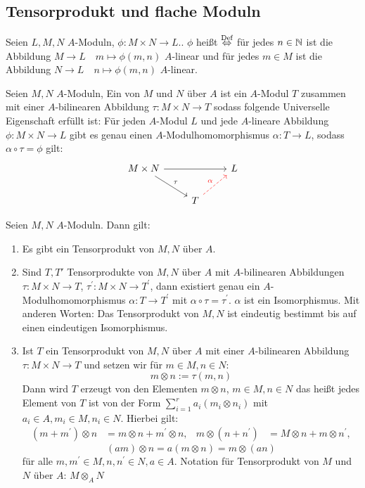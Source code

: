 \subsection{ Tensorprodukt und flache Moduln}
\begin{df}\label{13.1}
	Seien $L,M,N$ $A$-Moduln, $\phi: M \times N \to L. $. $ \phi$  heißt  $\overset{\text{Def}}{\Leftrightarrow}$ für jedes $n \in \mathbb{N} $ ist die Abbildung $M \to L \quad m \mapsto \phi(m,n) $ $A$-linear und für jedes $m \in M $ ist die Abbildung $ N \to L \quad n \mapsto \phi(m,n)  $ $A$-linear.
\end{df}
\begin{df} \label{13.2}
	Seien $M,N$ $A$-Moduln, Ein  von $M$ und $N$ über $A$ ist ein $A$-Modul $T$ zusammen mit einer $A$-bilinearen Abbildung $\tau: M \times N \to T $ sodass folgende Universelle Eigenschaft erfüllt ist: Für jeden $A$-Modul $L$ und jede $A$-lineare Abbildung $\phi: M \times N \to L $ gibt es genau einen $A$-Modulhomomorphismus $\alpha:  T \to L $, sodass $\alpha \circ \tau = \phi$ gilt:
	$$\begin{tikzcd}
	M \times N  \arrow{rr} \arrow{dr}{\tau} && L \\
	& T \arrow[dashed, red]{ur}{\alpha}&
	\end{tikzcd}$$
\end{df}
\begin{sa} \label{13.3}
	Seien $M,N $ $A$-Moduln. Dann gilt: 
	\begin{enumerate} [label= \alph*)]
		\item Es gibt ein Tensorprodukt von $M,N$ über $A$.
		\item Sind $T,T'$ Tensorprodukte von $M,N$ über $A$ mit $ A$-bilinearen Abbildungen $\tau: M \times N \to T$, $\tau^{'}: M \times N \to T^{'}$, dann existiert genau ein $A$-Modulhomomorphismus $\alpha: T \to T^{'} $ mit $\alpha \circ \tau = \tau^{'}. $ $ \alpha $ ist ein Isomorphismus. Mit anderen Worten: Das Tensorprodukt von $M,N$ ist eindeutig bestimmt bis auf einen eindeutigen Isomorphismus. 
		\item Ist $T$ ein Tensorprodukt von $M,N$ über $A$ mit einer $A$-bilinearen Abbildung $\tau: M \times N \to T $ und setzen wir für $m \in M, n \in N$: 
		$$ m \otimes n  := \tau(m,n)$$
		Dann wird $T$ erzeugt von den Elementen $m \otimes n $, $m \in M, n \in N $ das heißt jedes Element von $T$ ist von der Form $\sum_{i=1}^{r} a_i (m_i \otimes n_i) $ mit $ a_i \in A, m_i \in M , n_i \in N $. 
		Hierbei gilt:
		 \begin{align*}
		 (m +m^{'}) \otimes n &= m \otimes n + m^{'} \otimes n,&
		  m \otimes (n+n^{'}) &= M \otimes n + m \otimes n^{'},\end{align*}
		 $$(am) \otimes n = a ( m \otimes n ) = m \otimes (an) $$
	   für alle $m,m^{'} \in M, n,n^{'} \in N, a\in A $. Notation für Tensorprodukt von $M$ und $N$ über $A$: $M \otimes_A N $
	\end{enumerate}
\end{sa}
